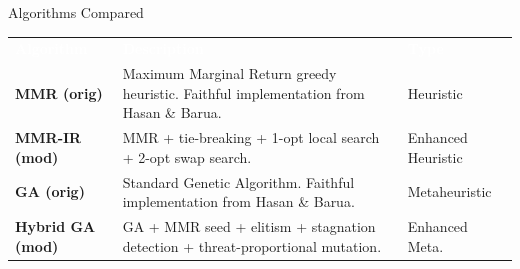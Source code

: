 \documentclass[aspectratio=169,10pt]{beamer}
\begin{document}
\begin{frame}{Algorithms Compared}


  \vspace{0.3cm}
  \begin{center}
  \small
  \begin{tabular}{lp{5cm}l}
    \toprule
    \rowcolor{DarkSlate}
    \textcolor{white}{\textbf{Algorithm}} &
    \textcolor{white}{\textbf{Description}} &
    \textcolor{white}{\textbf{Type}} \\
    \textbf{MMR (orig)} &
      Maximum Marginal Return greedy heuristic. Faithful implementation from Hasan \& Barua. &
      Heuristic \\[4pt]
    \textbf{MMR-IR (mod)} &
      MMR + tie-breaking + 1-opt local search + 2-opt swap search. &
      Enhanced Heuristic \\[4pt]
    \textbf{GA (orig)} &
      Standard Genetic Algorithm. Faithful implementation from Hasan \& Barua. &
      Metaheuristic \\[4pt]
    \textbf{Hybrid GA (mod)} &
      GA + MMR seed + elitism + stagnation detection + threat-proportional mutation. &
      Enhanced Meta. \\
    \bottomrule
  \end{tabular}
  \end{center}

  \vspace{0.3cm}
\end{frame}

\end{document}

